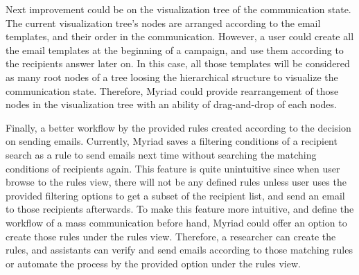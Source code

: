 Next improvement could be on the visualization tree of the communication state. The current visualization tree's nodes are arranged according to the email templates, and their order in the communication. However, a user could create all the email templates at the beginning of a campaign, and use them according to the recipients answer later on. In this case, all those templates will be considered as many root nodes of a tree loosing the hierarchical structure to visualize the communication state. Therefore, Myriad could provide rearrangement of those nodes in the visualization tree with an ability of drag-and-drop of each nodes.
\vspace{1cm}

Finally, a better workflow by the provided rules created according to the decision on sending emails. Currently, Myriad saves a filtering conditions of a recipient search as a rule to send emails next time without searching the matching conditions of recipients again. This feature is quite unintuitive since when user browse to the rules view, there will not be any defined rules unless user uses the provided filtering options to get a subset of the recipient list, and send an email to those recipients afterwards. To make this feature more intuitive, and define the workflow of a mass communication before hand, Myriad could offer an option to create those rules under the rules view. Therefore, a researcher can create the rules, and assistants can verify and send emails according to those matching rules or automate the process by the provided option under the rules view.

 